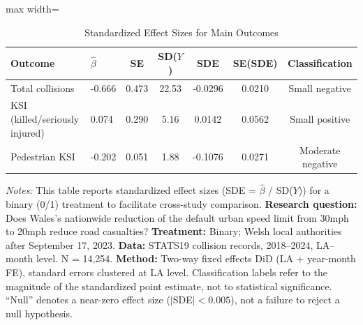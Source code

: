 \begin{table}[H]
\centering
\caption{Standardized Effect Sizes for Main Outcomes}
\label{tab:sde}
\begin{adjustbox}{max width=\textwidth}
\begin{tabular}{llccccc}
\toprule
Outcome & $\hat{\beta}$ & SE & SD($Y$) & SDE & SE(SDE) & Classification \\
\midrule
Total collisions & -0.666 & 0.473 & 22.53 & -0.0296 & 0.0210 & Small negative \\
KSI (killed/seriously injured) & 0.074 & 0.290 & 5.16 & 0.0142 & 0.0562 & Small positive \\
Pedestrian KSI & -0.202 & 0.051 & 1.88 & -0.1076 & 0.0271 & Moderate negative \\
\bottomrule
\end{tabular}
\end{adjustbox}
\par\vspace{0.3em}
{\footnotesize \emph{Notes:} This table reports standardized effect sizes (SDE = $\hat{\beta}$ / SD($Y$)) for a binary (0/1) treatment to facilitate cross-study comparison. \textbf{Research question:} Does Wales's nationwide reduction of the default urban speed limit from 30mph to 20mph reduce road casualties? \textbf{Treatment:} Binary; Welsh local authorities after September 17, 2023. \textbf{Data:} STATS19 collision records, 2018--2024, LA--month level. N = 14,254. \textbf{Method:} Two-way fixed effects DiD (LA + year-month FE), standard errors clustered at LA level. Classification labels refer to the magnitude of the standardized point estimate, not to statistical significance. ``Null'' denotes a near-zero effect size ($|$SDE$| < 0.005$), not a failure to reject a null hypothesis.}
\end{table}
